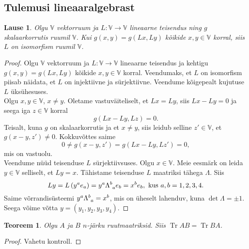 \documentclass[a4paper,12pt]{article}
\theoremstyle{plain}
\newtheorem{teoreem}{Teoreem}[section]
\newtheorem{lause}{Lause}[section]
\theoremstyle{definition}
\numberwithin{equation}{section}
\DeclareMathOperator{\Tr}{Tr}
\begin{document}
\subsection{Tulemusi lineaaralgebrast} \label{eelteadmised:algebra}
\begin{lause} \label{lemma:ort-skalaar-on-isomorfism}
Olgu $\mathbb{V}$ vektorruum ja $L : \mathbb{V} \rightarrow \mathbb{V}$ lineaarne teisendus ning $g$ skalaarkorrutis ruumil $\mathbb{V}$. Kui $g \left(x, y\right) = g \left(Lx, Ly\right)$ kõikide $x, y \in \mathbb{V}$ korral, siis $L$ on isomorfism ruumil $\mathbb{V}$.
\end{lause}

\begin{proof}
Olgu $\mathbb{V}$ vektorruum ja $L : \mathbb{V} \rightarrow \mathbb{V}$ lineaarne teisendus ja kehtigu $g \left(x, y\right) = g \left(Lx, Ly\right)$ kõikide $x, y \in \mathbb{V}$ korral. Veendumaks, et $L$ on isomorfism piisab näidata, et $L$ on injektiivne ja sürjektiivne. Veendume kõigepealt kujutuse $L$ üksühesuses.\\
Olgu $x, y \in \mathbb{V}$, $x \neq y$. Oletame vastuväiteliselt, et $Lx = Ly$, siis $Lx - Ly = 0$ ja seega iga $z \in \mathbb{V}$ korral
\begin{equation*}
g \left( Lx - Ly, Lz \right) = 0.
\end{equation*}
Teisalt, kuna $g$ on skalaarkorrutis ja et $x \neq y$, siis leidub selline $z' \in \mathbb{V}$, et $g \left( x - y, z' \right) \neq 0$. Kokkuvõttes saime
\begin{equation*}
0 \neq g \left (x-y,z'\right ) = g\left (Lx - Ly, Lz'\right ) = 0,
\end{equation*}
mis on vastuolu. \\
Veendume nüüd teisenduse $L$ sürjektiivsuses. Olgu $x \in \mathbb{V}$. Meie eesmärk on leida $y \in \mathbb{V}$ selliselt, et $Ly = x$. Tähistame teisenduse $L$ maatriksi tähega $\Lambda$. Siis
\[Ly = L\left(y^a e_a\right) = y^a \Lambda\indices{^b_a}e_b = x^b e_b, \text{ kus } a,b = 1,2,3,4.\]
Saime võrrandisüsteemi $y^a \Lambda\indices{^b_a} = x^b$, mis on üheselt lahenduv, kuna $\det \Lambda = \pm 1$. Seega võime võtta $y = (y_1, y_2, y_3, y_4)$.
\end{proof}

\begin{teoreem} \label{teor:trace}
Olgu $A$ ja $B$ $n$-järku ruutmaatriksid. Siis $\Tr AB = \Tr BA$.
\end{teoreem}
\begin{proof}
Vahetu kontroll.
\end{proof}
\end{document}
